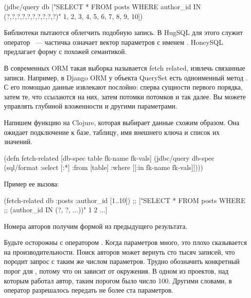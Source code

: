 \begin{english}
  \begin{clojure}
(jdbc/query db ["SELECT * FROM posts WHERE author_id IN (?,?,?,?,?,?,?,?,?,?)"
                1, 2, 3, 4, 5, 6, 7, 8, 9, 10])
  \end{clojure}
\end{english}

Библиотеки пытаются облегчить подобную запись. В HugSQL для этого служит оператор ~--- частичка  означает вектор параметров с именем . HoneySQL предлагает форму  с похожей семантикой.

В современных ORM такая выборка называется fetch related, извлечь связанные записи. Например, в Django ORM у объекта QuerySet есть одноименный метод . С его помощью данные извлекают послойно: сперва сущности первого порядка, затем те, что ссылаются на них, затем потомки потомков и так далее. Вы можете управлять глубиной вложенности и другими параметрами.

Напишем функцию на Clojure, которая выбирает данные схожим образом. Она ожидает подключение к базе, таблицу, имя внешнего ключа и список их значений.

\begin{english}
  \begin{clojure}
(defn fetch-related
  [db-spec table fk-name fk-vals]
  (jdbc/query
   db-spec
   (sql/format
   {:select [:*]
    :from [table]
    :where [[:in fk-name fk-vals]]})))
  \end{clojure}
\end{english}

Пример ее вызова:

\begin{english}
  \begin{clojure}
(fetch-related db :posts :author_id [1..10])
;; ["SELECT * FROM posts WHERE
;;   (author_id IN (?, ?, ...))" 1 2 ...]
  \end{clojure}
\end{english}

Номера авторов получим формой  из предыдущего результата.

Будьте осторожны с оператором . Когда параметров много, это плохо сказывается на производительности. Поиск авторов может вернуть сто тысяч записей, что породит запрос с таким же числом параметров. Трудно обозначить конкретный порог для , потому что он зависит от окружения. В одном из проектов, над которым работал автор, таким порогом было число 100. Другими словами, в оператор  разрешалось передать не более ста параметров.

